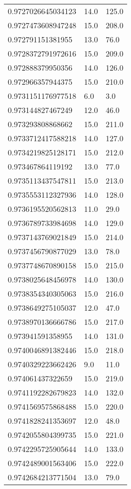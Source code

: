 \begin{center}
\begin{supertabular}[H]{p{0.30\textwidth}p{0.05\textwidth}p{0.05\textwidth}}
0.9727026645034123 & 14.0 & 125.0 \\ 
0.9727473608947248 & 15.0 & 208.0 \\ 
0.972791151381955 & 13.0 & 76.0 \\ 
0.9728372791972616 & 15.0 & 209.0 \\ 
0.972888379950356 & 14.0 & 126.0 \\ 
0.972966357944375 & 15.0 & 210.0 \\ 
0.9731151176977518 & 6.0 & 3.0 \\ 
0.973144827467249 & 12.0 & 46.0 \\ 
0.973293808868662 & 15.0 & 211.0 \\ 
0.9733712417588218 & 14.0 & 127.0 \\ 
0.9734219825128171 & 15.0 & 212.0 \\ 
0.973467864119192 & 13.0 & 77.0 \\ 
0.9735113437547811 & 15.0 & 213.0 \\ 
0.9735553112327936 & 14.0 & 128.0 \\ 
0.9736195520562813 & 11.0 & 29.0 \\ 
0.9736789733984698 & 14.0 & 129.0 \\ 
0.9737143769021849 & 15.0 & 214.0 \\ 
0.9737456790877029 & 13.0 & 78.0 \\ 
0.9737748670890158 & 15.0 & 215.0 \\ 
0.9738025648456978 & 14.0 & 130.0 \\ 
0.9738354340305063 & 15.0 & 216.0 \\ 
0.9738649275105037 & 12.0 & 47.0 \\ 
0.9738970136666786 & 15.0 & 217.0 \\ 
0.973941591358955 & 14.0 & 131.0 \\ 
0.9740046891382446 & 15.0 & 218.0 \\ 
0.9740329223662426 & 9.0 & 11.0 \\ 
0.974061437322659 & 15.0 & 219.0 \\ 
0.9741192282679823 & 14.0 & 132.0 \\ 
0.9741569575868488 & 15.0 & 220.0 \\ 
0.9741828241353697 & 12.0 & 48.0 \\ 
0.9742055804399735 & 15.0 & 221.0 \\ 
0.9742295725905644 & 14.0 & 133.0 \\ 
0.9742489001563406 & 15.0 & 222.0 \\ 
0.9742684213771504 & 13.0 & 79.0 \\ 

\end{supertabular}
\end{center}

